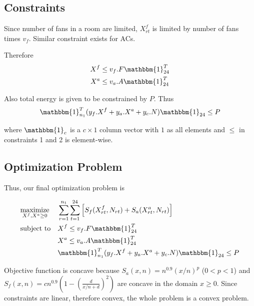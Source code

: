 \documentclass[a4paper]{article}
\begin{document}
\subsection{Constraints}
Since number of fans in a room are limited, $X^f_{rt}$ is limited by number of fans times $v_f$. 
Similar constraint exists for ACs. 

Therefore 
\begin{eqnarray}
X^f &\leq v_f.F\mathbbm{1}^T_{24}\\
X^a &\leq v_a.A\mathbbm{1}^T_{24}
\end{eqnarray}

Also total energy is given to be constrained by $P$.  Thus
\begin{eqnarray}
\mathbbm{1}^T_{n_1}(y_f.X^f + y_a.X^a + y_c.N)\mathbbm{1}_{24} \leq P
\end{eqnarray}

where $\mathbbm{1}_c$ is a $c \times 1$ column vector with $1$ as all elements and $\leq$ in constraints 1 and 2 is element-wise.

\subsection{Optimization Problem}

Thus, our final optimization problem is 

\begin{equation*}
\begin{aligned}
& \underset{X^f,X^a \geq 0}{\text{maximize}}
& & \sum_{r = 1}^{n_1} \sum_{t=1}^{24} \left [ S_f(X^f_{rt},N_{rt}) + S_a(X^a_{rt},N_{rt}) \right ] \\
& \text{subject to}
& & X^f \leq v_f.F\mathbbm{1}^T_{24}\\
&&& X^a \leq v_a.A\mathbbm{1}^T_{24}\\
&&& \mathbbm{1}^T_{n_1}(y_f.X^f + y_a.X^a + y_c.N)\mathbbm{1}_{24} \leq P
\end{aligned}
\end{equation*}


Objective function is concave because $S_a(x,n) = n^{0.9}(x/n)^p$ ($0 < p < 1$) and 
$S_f(x,n) = cn^{0.9}\left(1- \left (\frac{d}{x/n+d}\right )^2\right)$ are concave in the domain $x\geq 0$.
Since constraints are linear, therefore convex, the whole problem is a convex problem.
\end{document}
